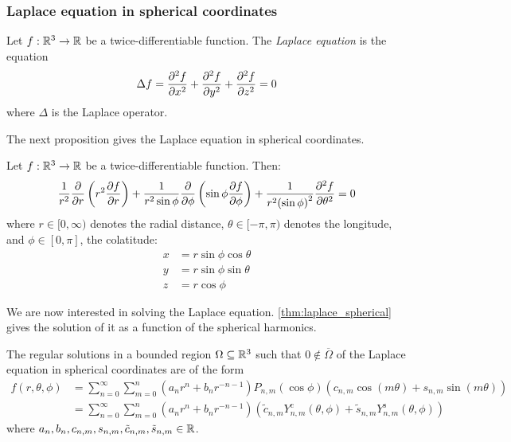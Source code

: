 \documentclass[../main.tex]{subfiles}
\begin{document}
\subsubsection{Laplace equation in spherical coordinates}\label{sec:laplace_spherical}
\begin{definition}
  Let $f:\mathbb{R}^3\rightarrow\mathbb{R}$ be a twice-differentiable function. The \emph{Laplace equation} is the equation
  \begin{equation}
    \Delta f=\pdv[2]{f}{x}+\pdv[2]{f}{y}+\pdv[2]{f}{z}=0
  \end{equation}
  where $\Delta$ is the Laplace operator.
\end{definition}
The next proposition gives the Laplace equation in spherical coordinates.
\begin{proposition}
  Let $f:\mathbb{R}^3\rightarrow\mathbb{R}$ be a twice-differentiable function. Then:
  \begin{equation}\label{eq:laplace}
    \frac{1}{r^2}\pdv{}{r}\left(r^2\pdv{f}{r}\right)+\frac{1}{r^2\sin\phi}\pdv{}{\phi}\left(\sin\phi\pdv{f}{\phi}\right)+\frac{1}{r^2{(\sin\phi)}^2}\pdv[2]{f}{\theta}=0
  \end{equation}
  where $r\in[0,\infty)$ denotes the radial distance, $\theta\in[-\pi,\pi)$ denotes the longitude, and $\phi\in[0,\pi]$, the colatitude:
  \begin{equation}
    \begin{aligned}
      x & =r\sin\phi\cos\theta \\
      y & =r\sin\phi\sin\theta \\
      z & =r\cos\phi
    \end{aligned}
  \end{equation}
\end{proposition}
We are now interested in solving the Laplace equation. \cref{thm:laplace_spherical} gives the solution of it as a function of the spherical harmonics.
\begin{theorem}\label{thm:laplace_spherical}
  The regular solutions in a bounded region $\Omega\subseteq \mathbb{R}^3$ such that $0\notin\overline{\Omega}$ of the Laplace equation in spherical coordinates are of the form
  \begin{align}
    f(r,\theta,\phi) & = \sum_{n=0}^\infty \sum_{m=0}^n (a_n r^{n} +b_{n}r^{-n-1})P_{n,m}(\cos\phi) (c_{n,m}\cos(m\theta)+s_{n,m}\sin(m\theta))                                                              \\
                     & \label{eq:sol_laplace} = \sum_{n=0}^\infty \sum_{m=0}^n (a_n r^{n} +b_{n}r^{-n-1})(\tilde{c}_{n,m}Y_{n,m}^{\mathrm{c}}(\theta,\phi)+\tilde{s}_{n,m}Y_{n,m}^{\mathrm{s}}(\theta,\phi))
  \end{align}
  where $a_n,b_n,c_{n,m},s_{n,m},\tilde{c}_{n,m},\tilde{s}_{n,m}\in\mathbb{R}$.
\end{theorem}
\end{document}
